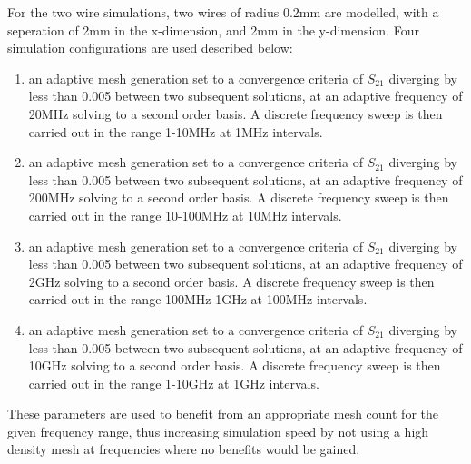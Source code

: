 For the two wire simulations, two wires of radius 0.2mm are modelled, with a seperation of 2mm in the x-dimension, and 2mm in the y-dimension. Four simulation configurations are used described below:

\begin{enumerate}
\item{an adaptive mesh generation set to a convergence criteria of $S_{21}$ diverging by less than 0.005 between two subsequent solutions, at an adaptive frequency of 20MHz solving to a second order basis. A discrete frequency sweep is then carried out in the range 1-10MHz at 1MHz intervals.}
\item{an adaptive mesh generation set to a convergence criteria of $S_{21}$ diverging by less than 0.005 between two subsequent solutions, at an adaptive frequency of 200MHz solving to a second order basis. A discrete frequency sweep is then carried out in the range 10-100MHz at 10MHz intervals.}
\item{an adaptive mesh generation set to a convergence criteria of $S_{21}$ diverging by less than 0.005 between two subsequent solutions, at an adaptive frequency of 2GHz solving to a second order basis. A discrete frequency sweep is then carried out in the range 100MHz-1GHz at 100MHz intervals.}
\item{an adaptive mesh generation set to a convergence criteria of $S_{21}$ diverging by less than 0.005 between two subsequent solutions, at an adaptive frequency of 10GHz solving to a second order basis. A discrete frequency sweep is then carried out in the range 1-10GHz at 1GHz intervals.}
\end{enumerate}

These parameters are used to benefit from an appropriate mesh count for the given frequency range, thus increasing simulation speed by not using a high density mesh at frequencies where no benefits would be gained.

